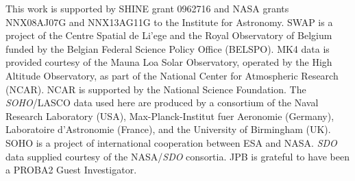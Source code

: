 \documentclass[namedreferences]{solarphysics}
\begin{document}
\begin{article}
%
  

%



%
 \begin{acks}
 
This work is supported by SHINE grant 0962716 and NASA grants NNX08AJ07G and NNX13AG11G to the Institute for Astronomy.
SWAP is a project of the Centre Spatial de Li'ege and the Royal Observatory of Belgium funded by the Belgian Federal Science Policy Office (BELSPO).
MK4 data is provided courtesy of the Mauna Loa Solar Observatory, operated by the High Altitude Observatory, as part of the National Center for Atmospheric Research (NCAR). NCAR is supported by the National Science Foundation.
The \emph{SOHO}/LASCO data used here are produced by a consortium of the Naval Research Laboratory (USA), Max-Planck-Institut fuer Aeronomie (Germany), Laboratoire d'Astronomie (France), and the University of Birmingham (UK). SOHO is a project of international cooperation between ESA and NASA.
\emph{SDO} data supplied courtesy of the NASA/\emph{SDO} consortia. JPB is grateful to have been a PROBA2 Guest Investigator.

 \end{acks}


%
%
 
   
%
%
%   
%  

\end{article} 
\end{document}
